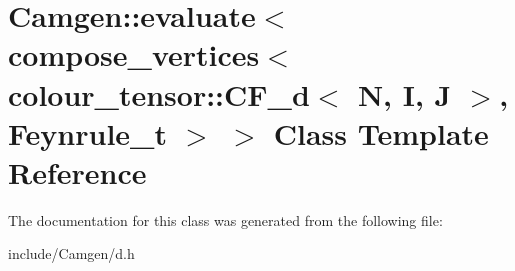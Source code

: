 \hypertarget{a00152}{\section{Camgen\-:\-:evaluate$<$ compose\-\_\-vertices$<$ colour\-\_\-tensor\-:\-:C\-F\-\_\-d$<$ N, I, J $>$, Feynrule\-\_\-t $>$ $>$ Class Template Reference}
\label{a00152}
}


The documentation for this class was generated from the following file\-:\begin{DoxyCompactItemize}
\item 
include/\-Camgen/d.\-h\end{DoxyCompactItemize}

